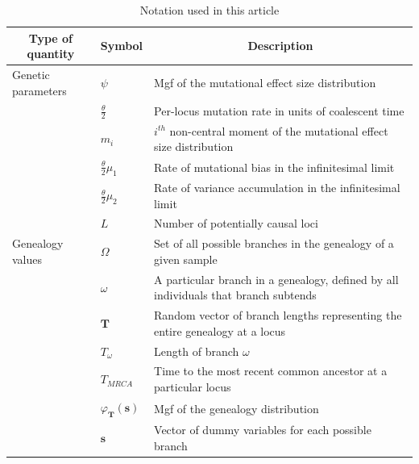 \begin{table}
  \caption{Notation used in this article}
  \centering
  \begin{tabular}{l l l}
    \hline
    \multicolumn{1}{c}{Type of quantity} &\multicolumn{1}{c}{Symbol} & \multicolumn{1}{c}{Description} \\
    \hline
    Genetic parameters & $\psi$ & \multicolumn{1}{p{10cm}}{Mgf of the mutational effect size distribution }\\
                                         & $\frac{\theta}{2}$ & \multicolumn{1}{p{10cm}}{Per-locus mutation rate in units of coalescent time}\\
                                         & $m_i$ &  \multicolumn{1}{p{10cm}}{$i^{th}$ non-central moment of the mutational effect size distribution}\\
                                         & $\frac{\theta}{2}\mu_1$ & \multicolumn{1}{p{10cm}}{Rate of mutational bias in the infinitesimal limit}\\
                                         & $\frac{\theta}{2}\mu_2$ & \multicolumn{1}{p{10cm}}{Rate of variance accumulation in the infinitesimal limit}\\
                                         & $L$ & \multicolumn{1}{p{10cm}}{Number of potentially causal loci}\\
    Genealogy values &  $\Omega$ & \multicolumn{1}{p{10cm}}{Set of all possible branches in the genealogy of a given sample}\\
                                         & $\omega$ & \multicolumn{1}{p{10cm}}{A particular branch in a genealogy, defined by all individuals that branch subtends}\\
                                         & $\mathbf{T}$ & \multicolumn{1}{p{10cm}}{Random vector of branch lengths representing the entire genealogy at a locus}\\
                                         & $T_\omega$ & \multicolumn{1}{p{10cm}}{Length of branch $\omega$} \\
                                         & $T_{MRCA}$ & \multicolumn{1}{p{10cm}}{Time to the most recent common ancestor at a particular locus}\\
                                         & $\varphi_{\mathbf{T}}(\mathbf{s})$ & Mgf of the genealogy distribution \\
                                         & $\mathbf{s}$ & Vector of dummy variables for each possible branch\\

\end{tabular}
\end{table}
